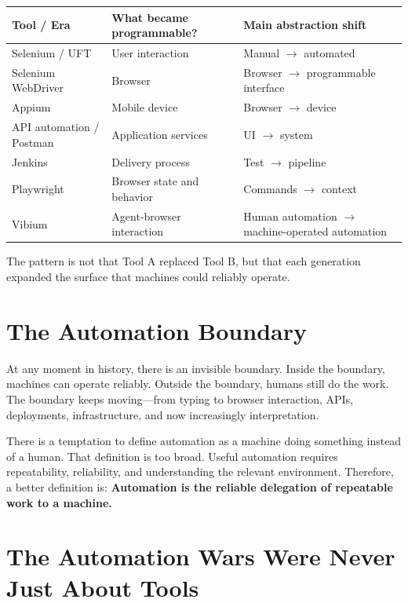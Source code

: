 \documentclass[11pt,twoside]{book}
\begin{document}
\begin{table}[h!]
\centering
\small
\begin{tabularx}{\textwidth}{lXX}
\toprule
\textbf{Tool / Era} & \textbf{What became programmable?} & \textbf{Main abstraction shift} \\
\midrule
Selenium / UFT & User interaction & Manual $\rightarrow$ automated \\
Selenium WebDriver & Browser & Browser $\rightarrow$ programmable interface \\
Appium & Mobile device & Browser $\rightarrow$ device \\
API automation / Postman & Application services & UI $\rightarrow$ system \\
Jenkins & Delivery process & Test $\rightarrow$ pipeline \\
Playwright & Browser state and behavior & Commands $\rightarrow$ context \\
Vibium & Agent-browser interaction & Human automation $\rightarrow$ machine-operated automation \\
\bottomrule
\end{tabularx}
\end{table}

The pattern is not that Tool A replaced Tool B, but that each generation expanded the surface that machines could reliably operate.

\section*{The Automation Boundary}

At any moment in history, there is an invisible boundary. Inside the boundary, machines can operate reliably. Outside the boundary, humans still do the work. The boundary keeps moving---from typing to browser interaction, APIs, deployments, infrastructure, and now increasingly interpretation.

There is a temptation to define automation as a machine doing something instead of a human. That definition is too broad. Useful automation requires repeatability, reliability, and understanding the relevant environment. Therefore, a better definition is: \textbf{Automation is the reliable delegation of repeatable work to a machine.}

\section*{The Automation Wars Were Never Just About Tools}
\end{document}
